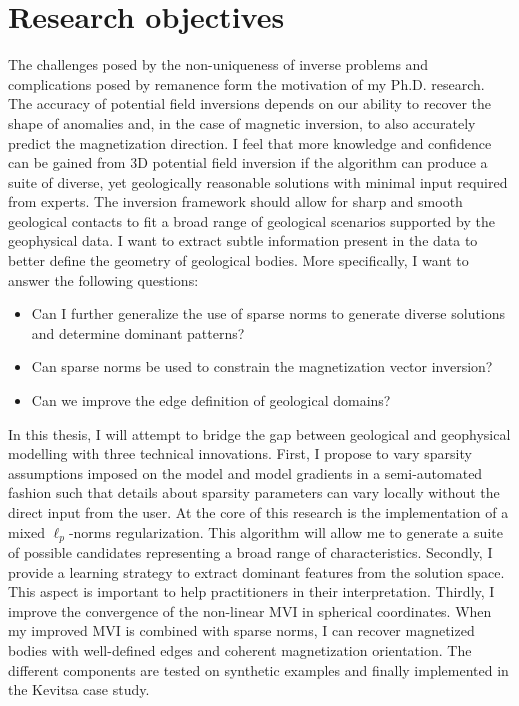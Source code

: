 \section{Research objectives}
The challenges posed by the non-uniqueness of inverse problems and complications posed by remanence form the motivation of my Ph.D. research. The accuracy of potential field inversions depends on our ability to recover the shape of anomalies and, in the case of magnetic inversion, to also accurately predict the magnetization direction.
I feel that more knowledge and confidence can be gained from 3D potential field inversion if the algorithm can produce a suite of diverse, yet geologically reasonable solutions with minimal input required from experts. The inversion framework should allow for sharp and smooth geological contacts to fit a broad range of geological scenarios supported by the geophysical data. I want to extract subtle information present in the data to better define the geometry of geological bodies.
More specifically, I want to answer the following questions:
\begin{itemize}
\item Can I further generalize the use of sparse norms to generate diverse solutions and determine dominant patterns?
\item Can sparse norms be used to constrain the magnetization vector inversion?
\item Can we improve the edge definition of geological domains?
\end{itemize}

In this thesis, I will attempt to bridge the gap between geological and geophysical modelling with three technical innovations. First, I propose to vary sparsity assumptions imposed on the model and model gradients in a semi-automated fashion such that details about sparsity parameters can vary locally without the direct input from the user.
At the core of this research is the implementation of a mixed $\ell_p$-norms regularization. This algorithm will allow me to generate a suite of possible candidates representing a broad range of characteristics.
Secondly, I provide a learning strategy to extract dominant features from the solution space. This aspect is important to help practitioners in their interpretation.
Thirdly, I improve the convergence of the non-linear MVI in spherical coordinates. When my improved MVI is combined with sparse norms, I can recover magnetized bodies with well-defined edges and coherent magnetization orientation. The different components are tested on synthetic examples and finally implemented in the Kevitsa case study.


